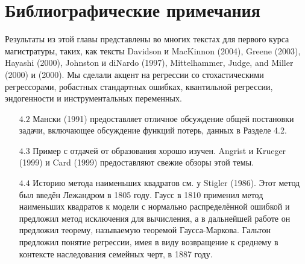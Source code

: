 \section{Библиографические примечания}

Результаты из этой главы представлены во многих текстах для первого курса магистратуры, таких, как тексты Davidson и MacKinnon (2004), Greene (2003), Hayashi (2000), Johnston и diNardo
(1997), Mittelhammer, Judge, and Miller (2000) и (2000). Мы сделали акцент на регрессии со стохастическими регрессорами, робастных стандартных ошибках, квантильной регрессии, эндогенности и инструментальных переменных.

\begin{itemize}
\item [$4.2$] Мански (1991) предоставляет отличное обсуждение общей постановки задачи, включающее обсуждение функций потерь, данных в Разделе 4.2.
\item [$4.3$] Пример с отдачей от образования хорошо изучен. Angrist и Krueger (1999) и Card
(1999) предоставляют свежие обзоры этой темы.
\item [$4.4$] Историю метода наименьших квадратов см. у Stigler (1986). Этот метод был введён Лежандром в 1805 году. Гаусс в 1810 применил метод наименьших квадратов к модели с нормально распределённой ошибкой и предложил метод исключения для вычисления, а в дальнейшей работе он предложил теорему, называемую теоремой Гаусса-Маркова. Гальтон предложил понятие регрессии, имея в виду возвращение к среднему в контексте наследования семейных черт, в 1887 году. 


\end{itemize}
